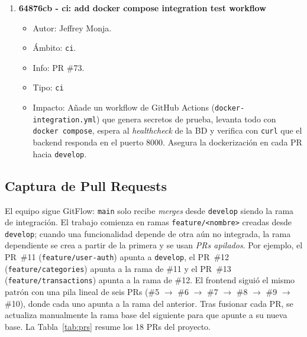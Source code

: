 \begin{enumerate}
    \item \textbf{64876cb - ci: add docker compose integration test workflow}
          \begin{itemize}
              \item Autor: Jeffrey Monja.
              \item Ámbito: \texttt{ci}.
              \item Info: PR \#73.
              \item Tipo: \texttt{ci}
              \item Impacto: Añade un workflow de GitHub Actions (\texttt{docker-integration.yml}) que genera secretos de prueba, levanta todo con \texttt{docker compose}, espera al \emph{healthcheck} de la BD y verifica con \texttt{curl} que el backend responda en el puerto 8000. Asegura la dockerización en cada PR hacia \texttt{develop}.
          \end{itemize}
\end{enumerate}

\subsection{Captura de Pull Requests}
El equipo sigue GitFlow: \texttt{main} solo recibe \emph{merges} desde \texttt{develop} siendo la rama de integración. El trabajo comienza en ramas \texttt{feature/<nombre>} creadas desde \texttt{develop}; cuando una funcionalidad depende de otra aún no integrada, la rama dependiente se crea a partir de la primera y se usan \emph{PRs apilados}. Por ejemplo, el PR~\#11 (\texttt{feature/user-auth}) apunta a \texttt{develop}, el PR~\#12 (\texttt{feature/categories}) apunta a la rama de \#11 y el PR~\#13 (\texttt{feature/transactions}) apunta a la rama de \#12. El frontend siguió el mismo patrón con una pila lineal de seis PRs (\#5 $\rightarrow$ \#6 $\rightarrow$ \#7 $\rightarrow$ \#8 $\rightarrow$ \#9 $\rightarrow$ \#10), donde cada uno apunta a la rama del anterior. Tras fusionar cada PR, se actualiza manualmente la rama base del siguiente para que apunte a su nueva base. La Tabla~\ref{tab:prs} resume los 18 PRs del proyecto.

